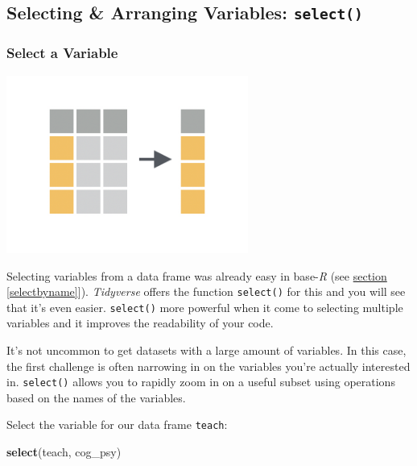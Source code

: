 \documentclass[
]{scrartcl}
\newenvironment{Shaded}{\begin{snugshade}}{\end{snugshade}}
\newcommand{\KeywordTok}[1]{\textcolor[rgb]{0.13,0.29,0.53}{\textbf{#1}}}
\newcommand{\NormalTok}[1]{#1}
\begin{document}
\hypertarget{selecting-arranging-variables-select}{%
\subsection{\texorpdfstring{Selecting \& Arranging Variables: \texttt{select()}}{Selecting \& Arranging Variables: select()}}\label{selecting-arranging-variables-select}}

\hypertarget{select-a-variable}{%
\subsubsection{Select a Variable}\label{select-a-variable}}

\begin{center}\includegraphics[width=300px]{images/dplyr-select} \end{center}

Selecting variables from a data frame was already easy in base-\emph{R} (see \protect\hyperlink{selectbyname}{section} \ref{selectbyname}{]}). \emph{Tidyverse} offers the function \texttt{select()} for this and you will see that it's even easier. \texttt{select()} more powerful when it come to selecting multiple variables and it improves the readability of your code.

It's not uncommon to get datasets with a large amount of variables. In this case, the first challenge is often narrowing in on the variables you're actually interested in. \texttt{select()} allows you to rapidly zoom in on a useful subset using operations based on the names of the variables.

Select the variable for our data frame \texttt{teach}:

\begin{Shaded}
\begin{Highlighting}[]
\KeywordTok{select}\NormalTok{(teach, cog\_psy)}
\end{Highlighting}
\end{Shaded}
\end{document}
